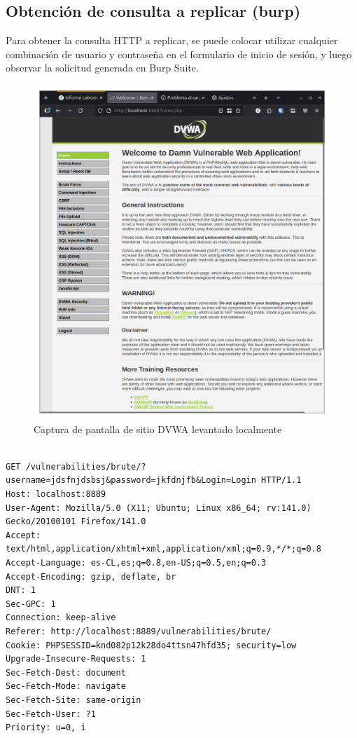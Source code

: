 \documentclass[letterpaper,12pt]{article}
\let\origsubsection\subsection
\renewcommand{\subsection}{\FloatBarrier\origsubsection}
\begin{document}
\subsection{Obtención de consulta a replicar (burp)}
Para obtener la consulta HTTP a replicar, se puede colocar utilizar cualquier combinación de usuario y contraseña en el formulario de inicio de sesión, y luego observar la solicitud generada en Burp Suite.
\begin{figure}
    \centering
    \includegraphics[width=1\linewidth]{levanteyredireccione/Captura desde 2025-10-01 23-14-34.png}
    \caption{Captura de pantalla de sitio DVWA levantado localmente}
    \label{fig:}
\end{figure}
\begin{verbatim}

GET /vulnerabilities/brute/?username=jdsfnjdsbsj&password=jkfdnjfb&Login=Login HTTP/1.1
Host: localhost:8889
User-Agent: Mozilla/5.0 (X11; Ubuntu; Linux x86_64; rv:141.0) Gecko/20100101 Firefox/141.0
Accept: text/html,application/xhtml+xml,application/xml;q=0.9,*/*;q=0.8
Accept-Language: es-CL,es;q=0.8,en-US;q=0.5,en;q=0.3
Accept-Encoding: gzip, deflate, br
DNT: 1
Sec-GPC: 1
Connection: keep-alive
Referer: http://localhost:8889/vulnerabilities/brute/
Cookie: PHPSESSID=knd082p12k28do4ttsn47hfd35; security=low
Upgrade-Insecure-Requests: 1
Sec-Fetch-Dest: document
Sec-Fetch-Mode: navigate
Sec-Fetch-Site: same-origin
Sec-Fetch-User: ?1
Priority: u=0, i


\end{verbatim}
\end{document}
